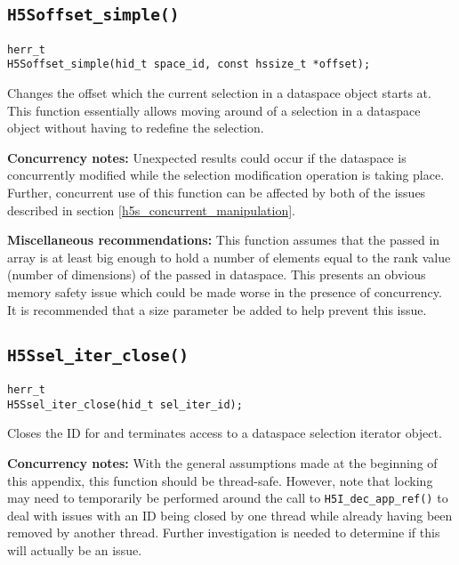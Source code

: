 \documentclass[../HDF5_RFC.tex]{subfiles}
\begin{document}
\subsection{\texttt{H5Soffset\_simple()}}
\label{apdx:h5s_func_h5soffset_simple}

\begin{verbatim}
herr_t
H5Soffset_simple(hid_t space_id, const hssize_t *offset);
\end{verbatim}

Changes the offset which the current selection in a dataspace object starts at. This function
essentially allows moving around of a selection in a dataspace object without having to
redefine the selection.

\textbf{Concurrency notes:} Unexpected results could occur if the dataspace is concurrently
modified while the selection modification operation is taking place. Further, concurrent use
of this function can be affected by both of the issues described in section 
\ref{h5s_concurrent_manipulation}.

\textbf{Miscellaneous recommendations:} This function assumes that the passed in array is
at least big enough to hold a number of elements equal to the rank value (number of
dimensions) of the passed in dataspace. This presents an obvious memory safety issue which
could be made worse in the presence of concurrency. It is recommended that a size parameter
be added to help prevent this issue.

\subsection{\texttt{H5Ssel\_iter\_close()}}
\label{apdx:h5s_func_h5ssel_iter_close}

\begin{verbatim}
herr_t
H5Ssel_iter_close(hid_t sel_iter_id);
\end{verbatim}

Closes the ID for and terminates access to a dataspace selection iterator object.

\textbf{Concurrency notes:} With the general assumptions made at the beginning of this
appendix, this function should be thread-safe. However, note that locking may need to
temporarily be performed around the call to \texttt{H5I\_dec\_app\_ref()} to deal with
issues with an ID being closed by one thread while already having been removed by another
thread. Further investigation is needed to determine if this will actually be an issue.
\end{document}
